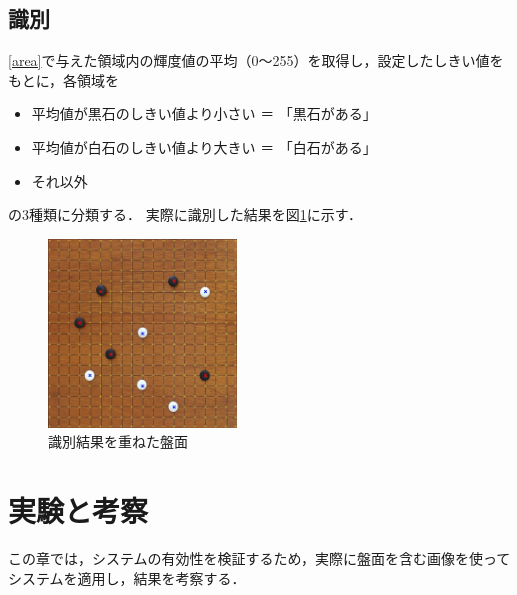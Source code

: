\documentclass[openright]{nitocs}
\numberwithin{equation}{section}
\begin{document}
        \subsection{識別} \label{identify}  
            \ref{area}で与えた領域内の輝度値の平均（0～255）を取得し，設定したしきい値をもとに，各領域を
            \begin{itemize} %
                \item 平均値が黒石のしきい値より小さい ＝ 「黒石がある」
                \item 平均値が白石のしきい値より大きい ＝ 「白石がある」
                \item それ以外
            \end{itemize}
            の3種類に分類する．
            実際に識別した結果を図\ref{result}に示す．

            \begin{figure}[tb] %
                \begin{center}
                \includegraphics[width=50mm,height=50mm]{result.jpg} 
                \caption{識別結果を重ねた盤面}
                \label{result}
                \end{center}
            \end{figure}


    \section{実験と考察} %
        この章では，システムの有効性を検証するため，実際に盤面を含む画像を使ってシステムを適用し，結果を考察する．
\end{document}
